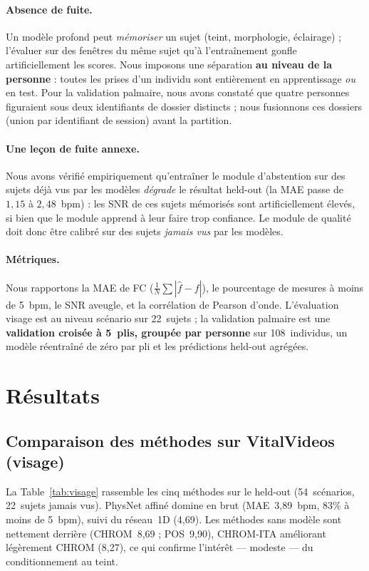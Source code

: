 \documentclass[11pt]{article}
\begin{document}
\paragraph{Absence de fuite.} Un modèle profond peut \emph{mémoriser} un sujet (teint,
morphologie, éclairage) ; l'évaluer sur des fenêtres du même sujet qu'à
l'entraînement gonfle artificiellement les scores. Nous imposons une séparation
\textbf{au niveau de la personne} : toutes les prises d'un individu sont entièrement
en apprentissage \emph{ou} en test. Pour la validation palmaire, nous avons constaté
que quatre personnes figuraient sous deux identifiants de dossier distincts ; nous
fusionnons ces dossiers (union par identifiant de session) avant la partition.

\paragraph{Une leçon de fuite annexe.} Nous avons vérifié empiriquement qu'entraîner
le module d'abstention sur des sujets déjà vus par les modèles \emph{dégrade} le
résultat held-out (la MAE passe de $1{,}15$ à $2{,}48$~bpm) : les SNR de ces sujets
mémorisés sont artificiellement élevés, si bien que le module apprend à leur faire
trop confiance. Le module de qualité doit donc être calibré sur des sujets
\emph{jamais vus} par les modèles.

\paragraph{Métriques.} Nous rapportons la MAE de FC ($\frac1N\sum|\hat{f}-f|$), le
pourcentage de mesures à moins de 5~bpm, le SNR aveugle, et la corrélation de Pearson
d'onde. L'évaluation visage est au niveau scénario sur 22~sujets ; la validation
palmaire est une \textbf{validation croisée à 5~plis, groupée par personne} sur
108~individus, un modèle réentraîné de zéro par pli et les prédictions held-out
agrégées.

\section{Résultats}
\label{sec:resultats}

\subsection{Comparaison des méthodes sur VitalVideos (visage)}
La Table~\ref{tab:visage} rassemble les cinq méthodes sur le held-out (54~scénarios,
22~sujets jamais vus). PhysNet affiné domine en brut (MAE~3{,}89~bpm, 83\% à moins de
5~bpm), suivi du réseau~1D (4{,}69). Les méthodes sans modèle sont nettement derrière
(CHROM~8{,}69 ; POS~9{,}90), CHROM-ITA améliorant légèrement CHROM (8{,}27), ce qui
confirme l'intérêt --- modeste --- du conditionnement au teint.
\end{document}
